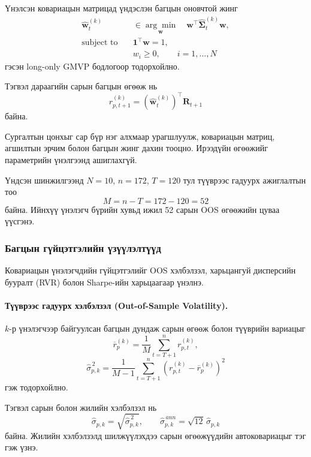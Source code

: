 Үнэлсэн ковариацын матрицад үндэслэн
багцын оновчтой жинг
\[
\begin{aligned}
	\widehat{\boldsymbol{w}}_t^{(k)}
	&\in
	\underset{\boldsymbol{w}}{\arg\min}
	\quad
	\boldsymbol{w}^{\top}
	\widehat{\boldsymbol{\Sigma}}_t^{(k)}
	\boldsymbol{w},\\
	\text{subject to}\quad
	&\boldsymbol{1}^{\top}\boldsymbol{w}=1,\\
	&w_i\geq 0,\qquad i=1,\ldots,N
\end{aligned}
\]
гэсэн long-only GMVP бодлогоор тодорхойлно.

Тэгвэл дараагийн сарын багцын өгөөж нь
\[
r_{p,t+1}^{(k)}
=
\left(\widehat{\boldsymbol{w}}_t^{(k)}\right)^\top
\boldsymbol{R}_{t+1}
\]
байна.

Сургалтын цонхыг сар бүр нэг алхмаар
урагшлуулж, ковариацын матриц, агшилтын
эрчим болон багцын жинг дахин тооцно.
Ирээдүйн өгөөжийг параметрийн үнэлгээнд
ашиглахгүй.

Үндсэн шинжилгээнд $N=10$, $n=172$,
$T=120$ тул түүврээс гадуурх ажиглалтын тоо
\[
M=n-T=172-120=52
\]
байна. Ийнхүү үнэлэгч бүрийн хувьд
ижил 52 сарын OOS өгөөжийн цуваа үүсгэнэ.


\subsubsection{Багцын гүйцэтгэлийн үзүүлэлтүүд}
\label{subsubsec:performance_measures}

Ковариацын үнэлэгчдийн гүйцэтгэлийг
OOS хэлбэлзэл, харьцангуй дисперсийн
бууралт (RVR) болон Sharpe-ийн
харьцаагаар үнэлнэ.

\paragraph{Түүврээс гадуурх хэлбэлзэл
	(Out-of-Sample Volatility).}

$k$-р үнэлэгчээр байгуулсан багцын
дундаж сарын өгөөж болон түүврийн
вариацыг
\[
\overline{r}_p^{(k)}
=
\frac{1}{M}
\sum_{t=T+1}^{n}r_{p,t}^{(k)},
\]
\[
\widehat{\sigma}_{p,k}^{\,2}
=
\frac{1}{M-1}
\sum_{t=T+1}^{n}
\left(
r_{p,t}^{(k)}
-
\overline{r}_p^{(k)}
\right)^2
\]
гэж тодорхойлно.

Тэгвэл сарын болон жилийн хэлбэлзэл нь
\[
\widehat{\sigma}_{p,k}
=
\sqrt{\widehat{\sigma}_{p,k}^{\,2}},
\qquad
\widehat{\sigma}_{p,k}^{\,ann}
=
\sqrt{12}\,\widehat{\sigma}_{p,k}
\]
байна. Жилийн хэлбэлзэлд шилжүүлэхдээ
сарын өгөөжүүдийн автоковариацыг тэг
гэж үзнэ.

